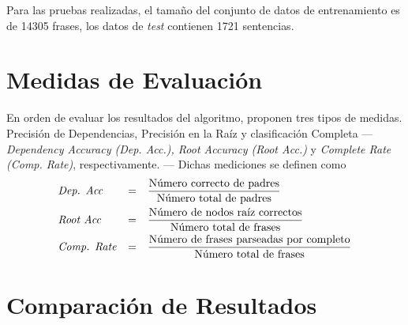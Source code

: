 Para las pruebas realizadas, el tamaño del conjunto de datos de entrenamiento es
de 14305 frases, los datos de \emph{test} contienen 1721 sentencias.

\section{Medidas de Evaluación}
\label{sec:eval}

En orden de evaluar los resultados del algoritmo, \citeauthor{yamada2003}
proponen tres tipos de medidas. Precisión de Dependencias, Precisión en la Raíz
y clasificación Completa --- \emph{Dependency Accuracy (Dep. Acc.), Root
  Accuracy (Root Acc.)} y \emph{Complete Rate (Comp. Rate)},
respectivamente. --- Dichas mediciones se definen como
\begin{equation*}
  \begin{aligned}
    & \text{\emph{Dep. Acc}} &=& \quad\frac{\text{Número correcto de padres}}{\text{Número
        total de padres}} \\
    & \text{\emph{Root Acc}} &=& \quad\frac{\text{Número de nodos raíz correctos}}{\text{Número
        total de frases}} \\
    & \text{\emph{Comp. Rate}} &=& \quad\frac{\text{Número de frases
        parseadas por completo}}{\text{Número total de frases}} 
  \end{aligned}
\end{equation*}

\section{Comparación de Resultados}
\label{sec:results}

